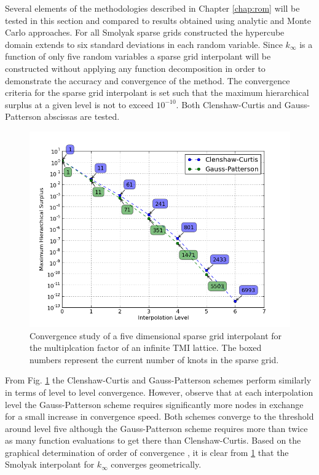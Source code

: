 Several elements of the methodologies described in Chapter \ref{chap:rom} will be tested in this section and compared to results obtained using analytic and Monte Carlo approaches. For all Smolyak sparse grids constructed the hypercube domain extends to six standard deviations in each random variable. Since $k_{\infty}$ is a function of only five random variables a sparse grid interpolant will be constructed without applying any function decomposition in order to demonstrate the accuracy and convergence of the method. The convergence criteria for the sparse grid interpolant is set such that the maximum hierarchical surplus at a given level is not to exceed $10^{-10}$. Both Clenshaw-Curtis and Gauss-Patterson abscissas are tested. 
\begin{figure}
\caption{ \label{fig:kinf_sg_convergence}
Convergence study of a five dimensional sparse grid interpolant for the  multiplcation factor of an infinite TMI lattice. The boxed numbers represent the current number of knots in the sparse grid.}
 \begin{center}
  \includegraphics[scale=.75]{./Chapter3/kinf_sparse_grid_convergence.png}
 \end{center}
\end{figure}

From Fig. \ref{fig:kinf_sg_convergence} the Clenshaw-Curtis and Gauss-Patterson schemes perform similarly in terms of level to level convergence. However, observe that at each interpolation level the Gauss-Patterson scheme requires significantly more nodes in exchange for a small increase in convergence speed. Both schemes converge to the threshold around level five although the Gauss-Patterson scheme requires more than twice as many function evaluations to get there than Clenshaw-Curtis. Based on the graphical determination of order of convergence \cite{Boyd}, it is clear from \ref{fig:kinf_sg_convergence} that the Smolyak interpolant for $k_{\infty}$ converges geometrically.


